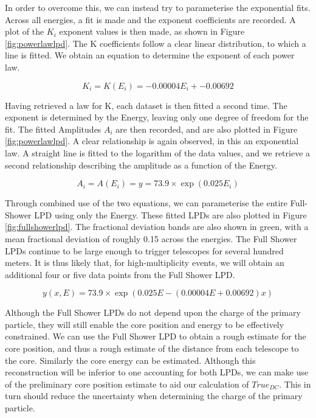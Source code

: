 \documentclass[11pt]{article}
\begin{document}
In order to overcome this, we can instead try to parameterise the exponential fits. Across all energies, a fit is made and the exponent coefficients are recorded. A plot of the $K_{i}$ exponent values is then made, as shown in Figure  \ref{fig:powerlawlpd}. The K coefficients follow a clear linear distribution, to which a line is fitted. We obtain an equation to determine the exponent of each power law. 

\[ K_{i} = K(E_{i}) = -0.00004 E_{i} + -0.00692 \]

Having retrieved a law for K, each dataset is then fitted a second time. The exponent is determined by the Energy, leaving only one degree of freedom for the fit. The fitted Amplitudes $A_{i}$ are then recorded, and are also plotted in Figure \ref{fig:powerlawlpd}. A clear relationship is again observed, in this an exponential law. A straight line is fitted to the logarithm of the data values, and we retrieve a second relationship describing the amplitude as a function of the Energy.

\[ A_{i} = A(E_{i}) =y =73.9 \times \exp (0.025 E_{i}) \]

Through combined use of the two equations, we can parameterise the entire Full-Shower LPD using only the Energy. These fitted LPDs are also plotted in Figure \ref{fig:fullshowerlpd}. The fractional deviation bands are also shown in green, with a mean fractional deviation of roughly 0.15 across the energies. The Full Shower LPDs continue to be large enough to trigger telescopes for several hundred meters. It is thus likely that, for high-multiplicity events, we will obtain an additional four or five data points from the Full Shower LPD.

\[ y (x, E) = 73.9 \times \exp (0.025 E -(0.00004 E + 0.00692)x) \]

Although the Full Shower LPDs do not depend upon the charge of the primary particle, they will still enable the core position and energy to be effectively constrained. We can use the Full Shower LPD to obtain a rough estimate for the core position, and thus a rough estimate of the distance from each telescope to the core. Similarly the core energy can be estimated. Although this reconstruction will be inferior to one accounting for both LPDs, we can make use of the preliminary core position estimate to aid our calculation of $True_{DC}$. This in turn should reduce the uncertainty when determining the charge of the primary particle.
\end{document}
